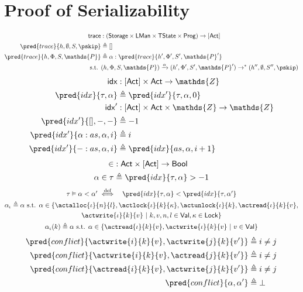 \section{Proof of Serializability}

\begin{align*}
\mathsf{trace} &: (\mathsf{Storage} \times \mathsf{LMan} \times \mathsf{TState} \times \mathsf{Prog}) \rightarrow [\mathsf{Act}] \\
\pred{trace}{h, \emptyset, S, \pskip} &\triangleq [] \\
\pred{trace}{h, \Phi, S, \mathds{P}} &\triangleq \alpha : \pred{trace}{h', \Phi', S', \mathds{P}'}
\\
\text{s.t. }& (h, \Phi, S, \mathds{P}) \xrightarrow{\alpha} (h', \Phi', S', \mathds{P}') \rightarrow^* (h'', \emptyset, S'', \pskip)
\end{align*}
\begin{align*}
\mathsf{idx} &: [\mathsf{Act}] \times \mathsf{Act} \rightarrow \mathds{Z} \\
\pred{idx}{\tau, \alpha} &\triangleq \pred{idx'}{\tau, \alpha, 0} \\
\mathsf{idx}' &: [\mathsf{Act}] \times \mathsf{Act} \times \mathds{Z} \rightarrow \mathds{Z} \\
\pred{idx'}{[], -, -} &\triangleq -1 \\
\pred{idx'}{\alpha:as, \alpha, i} &\triangleq i \\
\pred{idx'}{-:as, \alpha, i} &\triangleq \pred{idx}{as, \alpha, i + 1}
\end{align*}
\begin{align*}
\in &: \mathsf{Act} \times [\mathsf{Act}] \rightarrow \mathsf{Bool} \\
\alpha \in \tau &\triangleq \pred{idx}{\tau, \alpha} > -1
\end{align*}
\begin{gather*}
\begin{array}{l l}
\tau \vDash \alpha < \alpha' \overset{\text{def}}{\iff}
&
\pred{idx}{\tau, \alpha} < \pred{idx}{\tau, \alpha'}
\end{array}
\\
\alpha_\iota \triangleq \alpha \text{ s.t. } \alpha \in \{ \actalloc{\iota}{n}{l}, \actlock{\iota}{k}{\kappa}, \actunlock{\iota}{k}, \actread{\iota}{k}{v}, \\ \actwrite{\iota}{k}{v}\ |\ k, v, n, l \in \mathsf{Val}, \kappa \in \mathsf{Lock} \}
\\
\alpha_\iota(k) \triangleq \alpha \text{ s.t. } \alpha \in \{ \actread{\iota}{k}{v}, \actwrite{\iota}{k}{v}\ |\ v \in \mathsf{Val} \}
\end{gather*}
\begin{align*}
\pred{conflict}{\actwrite{i}{k}{v}, \actwrite{j}{k}{v'}} &\triangleq i \neq j
\\
\pred{conflict}{\actwrite{i}{k}{v}, \actread{j}{k}{v'}} &\triangleq i \neq j
\\
\pred{conflict}{\actread{i}{k}{v}, \actwrite{j}{k}{v'}} &\triangleq i \neq j
\\
\pred{conflict}{\alpha, \alpha'} &\triangleq \bot 
\end{align*}

